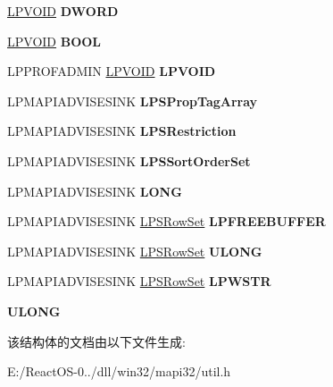 \begin{DoxyCompactItemize}
\mbox{\label{struct_m_a_p_i___f_u_n_c_t_i_o_n_s_af4cd9b9115220884128640468c9ebf9a}} 
\hyperlink{interfacevoid}{L\+P\+V\+O\+ID} {\bfseries D\+W\+O\+RD}
\item 
\mbox{\label{struct_m_a_p_i___f_u_n_c_t_i_o_n_s_adf695b6181e2c80ed763636c69e4ac05}} 
\hyperlink{interfacevoid}{L\+P\+V\+O\+ID} {\bfseries B\+O\+OL}
\item 
\mbox{\label{struct_m_a_p_i___f_u_n_c_t_i_o_n_s_aaf954082cf91fa01cec316720c5bbf77}} 
L\+P\+P\+R\+O\+F\+A\+D\+M\+IN \hyperlink{interfacevoid}{L\+P\+V\+O\+ID} {\bfseries L\+P\+V\+O\+ID}
\item 
\mbox{\label{struct_m_a_p_i___f_u_n_c_t_i_o_n_s_a589c7c5327c81b079c4c39492b7bff8a}} 
L\+P\+M\+A\+P\+I\+A\+D\+V\+I\+S\+E\+S\+I\+NK {\bfseries L\+P\+S\+Prop\+Tag\+Array}
\item 
\mbox{\label{struct_m_a_p_i___f_u_n_c_t_i_o_n_s_ad1e9bdecf095c67b1c284fb4f66285e2}} 
L\+P\+M\+A\+P\+I\+A\+D\+V\+I\+S\+E\+S\+I\+NK {\bfseries L\+P\+S\+Restriction}
\item 
\mbox{\label{struct_m_a_p_i___f_u_n_c_t_i_o_n_s_ad43ff17289d388eb368b0d41a9345fcb}} 
L\+P\+M\+A\+P\+I\+A\+D\+V\+I\+S\+E\+S\+I\+NK {\bfseries L\+P\+S\+Sort\+Order\+Set}
\item 
\mbox{\label{struct_m_a_p_i___f_u_n_c_t_i_o_n_s_afe066c3f238f13a3b3a514246169a4f3}} 
L\+P\+M\+A\+P\+I\+A\+D\+V\+I\+S\+E\+S\+I\+NK {\bfseries L\+O\+NG}
\item 
\mbox{\label{struct_m_a_p_i___f_u_n_c_t_i_o_n_s_af027d4d371e56be35c3013d1e9f9ea1e}} 
L\+P\+M\+A\+P\+I\+A\+D\+V\+I\+S\+E\+S\+I\+NK \hyperlink{struct___s_row_set}{L\+P\+S\+Row\+Set} {\bfseries L\+P\+F\+R\+E\+E\+B\+U\+F\+F\+ER}
\item 
\mbox{\label{struct_m_a_p_i___f_u_n_c_t_i_o_n_s_ae18cac544a7fe04e90a5b62bf4a076bf}} 
L\+P\+M\+A\+P\+I\+A\+D\+V\+I\+S\+E\+S\+I\+NK \hyperlink{struct___s_row_set}{L\+P\+S\+Row\+Set} {\bfseries U\+L\+O\+NG}
\item 
\mbox{\label{struct_m_a_p_i___f_u_n_c_t_i_o_n_s_a944399cb3d1d7265917d8c22bf924bea}} 
L\+P\+M\+A\+P\+I\+A\+D\+V\+I\+S\+E\+S\+I\+NK \hyperlink{struct___s_row_set}{L\+P\+S\+Row\+Set} {\bfseries L\+P\+W\+S\+TR}
\item 
\mbox{\label{struct_m_a_p_i___f_u_n_c_t_i_o_n_s_a3ee4fc2908532f57cb00b0d8877d4ef9}} 
{\bfseries U\+L\+O\+NG}
\end{DoxyCompactItemize}


该结构体的文档由以下文件生成\+:\begin{DoxyCompactItemize}
\item 
E\+:/\+React\+O\+S-\/0../dll/win32/mapi32/util.\+h\end{DoxyCompactItemize}
